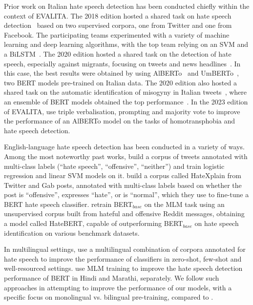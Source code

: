 \documentclass[11pt]{article}
\newcommand{\paolo}[1]{{\color{red} #1}}
\begin{document}
Prior work on Italian hate speech detection has been conducted chiefly within the context of EVALITA\@. The 2018 edition hosted a shared task on hate speech detection~\cite{boscoOverviewEVALITA2018} based on two supervised corpora, one from Twitter and one from Facebook. The participating teams experimented with a variety of machine learning and deep learning algorithms, with the top team relying on an SVM and a BiLSTM~\cite{cimino2018multi}. The 2020 edition hosted a shared task on the detection of hate speech, especially against migrants, focusing on tweets and news headlines~\cite{basileEVALITA2020Overview}. In this case, the best results were obtained by using AlBERTo~\cite{PolignanoEtAlCLIC2019} and UmBERTo~\cite{musixmatch-2020-umberto}, two BERT models pre-trained on Italian data. The 2020 edition also hosted a shared task on the automatic identification of misogyny in Italian tweets~\cite{fersiniAMIEVALITA2020Automatic2020}, where an ensemble of BERT models obtained the top performance~\cite{mutiUniBOAMIMultiClass2020}. \paolo{In the 2023 edition of EVALITA, \newcite{bonaventura2023odang} use triple verbalisation, prompting and majority vote to improve the performance of an AlBERTo model on the tasks of homotransphobia and hate speech detection.}

English-language hate speech detection has been conducted in a variety of ways. \paolo{Among the most noteworthy past works,}  build a corpus of tweets annotated with multi-class labels (``hate speech'', ``offensive'', ``neither'') and train logistic regression and linear SVM models on it.
 build a corpus called HateXplain from Twitter and Gab posts, annotated with multi-class labels based on whether the post is ``offensive'', expresses ``hate'', or is ``normal'', which they use to fine-tune a BERT hate speech classifier.
 retrain BERT$_{base}$ on the MLM task using an unsupervised corpus built from hateful and offensive Reddit messages, obtaining a model called HateBERT, capable of outperforming BERT$_{base}$ on hate speech identification on various benchmark datasets.

In multilingual settings,  use a multilingual combination of corpora annotated for hate speech to improve the performance of classifiers in zero-shot, few-shot and well-resourced settings.  use MLM training to improve the hate speech detection performance of BERT in Hindi and Marathi, separately. We follow such approaches in attempting to improve the performance of our models, with a specific focus on monolingual vs. bilingual pre-training, compared to .
\end{document}

